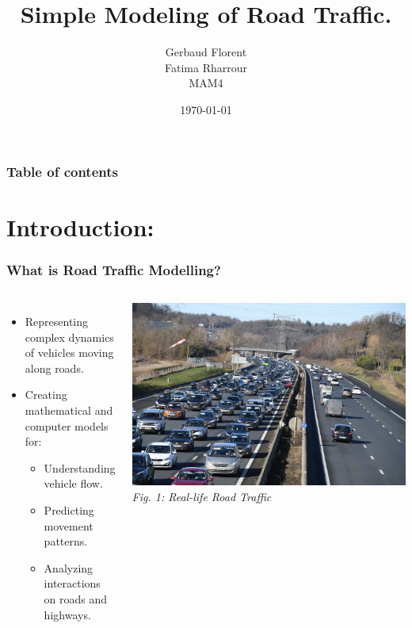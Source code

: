 \documentclass{beamer}
\title[2023-2024]{Simple Modeling of Road Traffic.}
\author{Gerbaud Florent \\ Fatima Rharrour \\ MAM4}
\institute[Polytech Nice-Sophia] %
{
Supervisor: \\ %
\medskip
{Didier Auroux} %
}
\date{\today} %
\begin{document}
\begin{frame}
\titlepage 
\end{frame}

\begin{frame}
\frametitle{Table of contents} 
\tableofcontents
\end{frame}


\section{Introduction:} 
\begin{frame}
	\begin{center}
		\frametitle{What is Road Traffic Modelling?}
	\end{center}
	\begin{columns}
		\begin{itemize}
			\item Representing complex dynamics of vehicles moving along roads.
			\item Creating mathematical and computer models for:
			\begin{itemize}
				\item Understanding vehicle flow.
				\item Predicting movement patterns.
				\item Analyzing interactions on roads and highways.
			\end{itemize}
		\end{itemize}
		
		\begin{center}
			\includegraphics[width=\textwidth]{PIC1.jpg}
			\tiny{\textit{Fig. 1: Real-life Road Traffic}}
		\end{center}
	\end{columns}
\end{frame}
\end{document}
